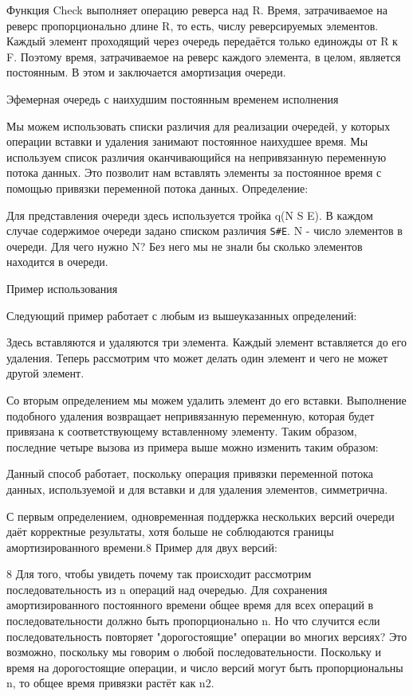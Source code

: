 Функция Check выполняет операцию реверса над R. Время, затрачиваемое на реверс пропорционально длине R, то есть, числу реверсируемых элементов. Каждый элемент проходящий через очередь передаётся только единожды от R к F. Поэтому время, затрачиваемое на реверс каждого элемента, в целом, является постоянным. В этом и заключается амортизация очереди.

Эфемерная очередь с наихудшим постоянным временем исполнения

Мы можем использовать списки различия для реализации очередей, у которых операции вставки и удаления занимают постоянное наихудшее время. Мы используем список различия оканчивающийся на непривязанную переменную потока данных. Это позволит нам вставлять элементы за постоянное время с помощью привязки переменной потока данных. Определение:

Для представления очереди здесь используется тройка q(N S E). В каждом случае содержимое очереди задано списком различия \verb!S#E!. N - число элементов в очереди. Для чего нужно N? Без него мы не знали бы сколько элементов находится в очереди.

Пример использования

Следующий пример работает с любым из вышеуказанных определений:

Здесь вставляются и удаляются три элемента. Каждый элемент вставляется до его удаления. Теперь рассмотрим что может делать один элемент и чего не может другой элемент.

Со вторым определением мы можем удалить элемент до его вставки. Выполнение подобного удаления возвращает непривязанную переменную, которая будет привязана к соответствующему вставленному элементу. Таким образом, последние четыре вызова из примера выше можно изменить таким образом:

Данный способ работает, поскольку операция привязки переменной потока данных, используемой и для вставки и для удаления элементов, симметрична.

С первым определением, одновременная поддержка нескольких версий очереди даёт корректные результаты, хотя больше не соблюдаются границы амортизированного времени.8 Пример для двух версий:

8 Для того, чтобы увидеть почему так происходит рассмотрим последовательность из n операций над очередью. Для сохранения амортизированного постоянного времени общее время для всех операций в последовательности должно быть пропорционально n. Но что случится если последовательность повторяет "дорогостоящие" операции во многих версиях? Это возможно, поскольку мы говорим о любой последовательности. Поскольку и время на дорогостоящие операции, и число версий могут быть пропорциональны n, то общее время привязки растёт как n2.

